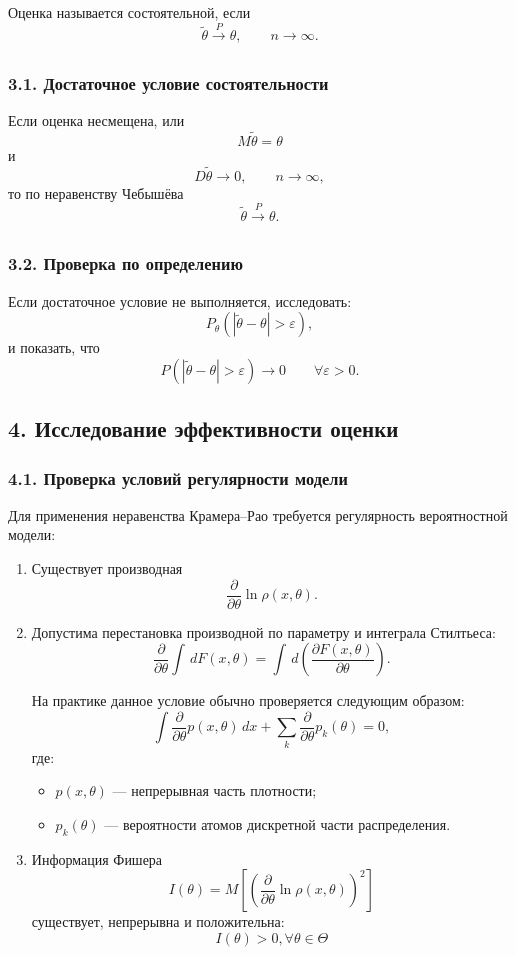 \documentclass{article}
\begin{document}
Оценка называется состоятельной, если
\[
\widetilde{\theta}\xrightarrow[]{P}\theta,
\qquad n\to\infty.
\]

\subsubsection*{3.1. Достаточное условие состоятельности}

Если оценка несмещена, или
\[
M\widetilde{\theta}=\theta
\]
и
\[
D\widetilde{\theta}\to0,
\qquad n\to\infty,
\]
то по неравенству Чебышёва
\[
\widetilde{\theta}\xrightarrow[]{P}\theta.
\]

\subsubsection*{3.2. Проверка по определению}

Если достаточное условие не выполняется, исследовать:
\[
P_\theta\left(
|\widetilde{\theta}-\theta|>\varepsilon
\right),
\]
и показать, что
\[
P\left(
|\widetilde{\theta}-\theta|>\varepsilon
\right)\to0
\qquad \forall \varepsilon>0.
\]

\subsection*{4. Исследование эффективности оценки}

\subsubsection*{4.1. Проверка условий регулярности модели}

Для применения неравенства Крамера--Рао требуется регулярность вероятностной модели:

\begin{enumerate}
    \item Существует производная
    \[
    \frac{\partial}{\partial\theta}
    \ln \rho(x, \theta).
    \]

    \item Допустима перестановка производной по параметру и интеграла Стилтьеса:
    \[
    \frac{\partial}{\partial\theta}
    \int
    \,dF(x,\theta)
    =
    \int
    \,d\!\left(
    \frac{\partial F(x,\theta)}{\partial\theta}
    \right).
    \]

    На практике данное условие обычно проверяется следующим образом:
    \[
    \int
    \frac{\partial}{\partial\theta}
    p(x, \theta)\,dx
    +
    \sum_k
    \frac{\partial}{\partial\theta}
    p_k(\theta)
    =
    0,
    \]
    где:
    \begin{itemize}
        \item \(p(x, \theta)\) --- непрерывная часть плотности;
        \item \(p_k(\theta)\) --- вероятности атомов дискретной части распределения.
    \end{itemize}

    \item Информация Фишера
    \[
    I(\theta)
    =
    M[
    \left(
    \frac{\partial}{\partial\theta}
    \ln \rho(x, \theta)
    \right)^2]
    \]
    существует, непрерывна и положительна:
    \[
    I(\theta)>0, \forall \theta \in \Theta
    \]
\end{enumerate}
\end{document}
